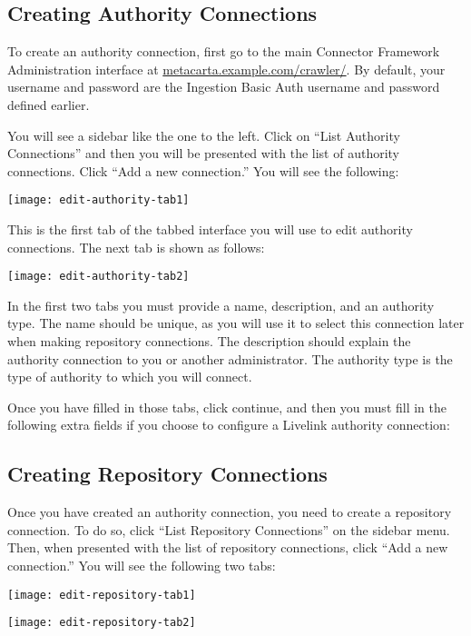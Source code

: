 \begin{changemargin}{1.5in}{0in}
\subsection{Creating Authority Connections}

To create an authority connection, first go to the
main Connector Framework Administration interface at
\url{metacarta.example.com/crawler/}.  By default, your username and
password are the Ingestion Basic Auth username and password defined
earlier. 

You will see a sidebar like the one to the left. Click on ``List
Authority Connections'' and then you will be presented with the
list of authority connections. Click ``Add a new connection.''
You will see the following:




\texttt{[image: edit-authority-tab1]}

This is the first tab of the tabbed interface you will use to edit
authority connections. The next tab is shown as follows:

\texttt{[image: edit-authority-tab2]}

In the first two tabs you must provide a name, description, and an
authority type. The name should be unique, as you will use it to
select this connection later when making repository connections. The
description should explain the authority connection to you or another
administrator. The authority type is the type of authority to which
you will connect.

Once you have filled in those tabs, click continue, and then 
you must fill in the following extra fields if you choose to
configure a Livelink authority connection:



\subsection{Creating Repository Connections}

Once you have created an authority connection, you need to create a
repository connection.
To do so, click ``List Repository Connections'' on the sidebar menu. Then,
when presented with the list of repository connections, click ``Add a
new connection.'' You will see the following two tabs:

\texttt{[image: edit-repository-tab1]}

\texttt{[image: edit-repository-tab2]}


\end{changemargin}
